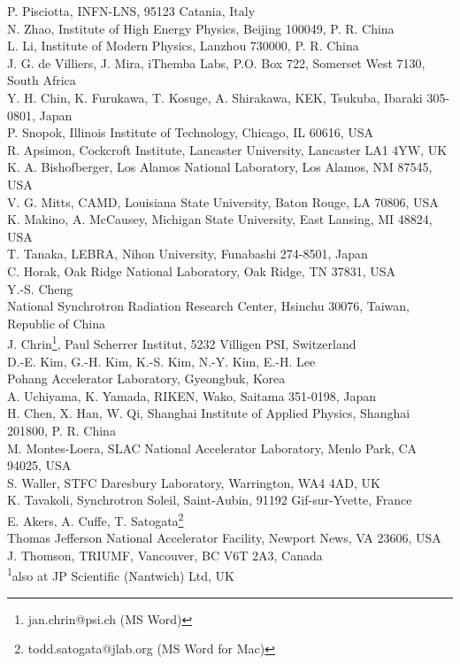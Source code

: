 \documentclass[a4paper,
               keeplastbox,   %
                luatex,       %
               ]{jacow}
\begin{document}
{		P. Pisciotta, INFN-LNS, 95123 Catania, Italy \\
		N. Zhao, Institute of High Energy Physics, Beijing 100049, P. R. China \\
		L. Li, Institute of Modern Physics, Lanzhou 730000, P. R. China \\
		J. G. de Villiers, J. Mira, iThemba Labs, P.O. Box 722, Somerset West 7130, South Africa \\
		Y. H. Chin, K. Furukawa, T. Kosuge, A. Shirakawa, 
		KEK, Tsukuba, Ibaraki 305-0801, Japan \\
		P. Snopok, Illinois Institute of Technology, Chicago, IL 60616, USA \\
		R. Apsimon, Cockcroft Institute, Lancaster University, Lancaster LA1 4YW, UK \\
		K. A. Bishofberger, Los Alamos National Laboratory, Los Alamos, NM 87545, USA \\
		V. G. Mitts, CAMD, Louisiana State University, Baton Rouge, LA 70806, USA \\ 
		K. Makino, A. McCausey, Michigan State University, East Lansing, MI 48824, USA \\
		T. Tanaka, LEBRA, Nihon University, Funabashi 274-8501, Japan \\
		C. Horak, Oak Ridge National Laboratory, Oak Ridge, TN 37831, USA \\
		Y.-S. Cheng \\
		National Synchrotron Radiation Research Center, Hsinchu 30076, Taiwan, Republic of China \\ 
		J. Chrin\thanks{jan.chrin@psi.ch (MS Word)}, Paul Scherrer Institut, 5232 Villigen PSI, Switzerland \\
		D.-E. Kim, G.-H. Kim, K.-S. Kim, N.-Y. Kim, E.-H. Lee \\
		Pohang Accelerator Laboratory, Gyeongbuk, Korea\\
		A. Uchiyama, K. Yamada, RIKEN, Wako, Saitama 351-0198, Japan \\
		H. Chen, X. Han, W. Qi, Shanghai Institute of Applied Physics, Shanghai 201800, P. R. China \\
		M. Montes-Loera, SLAC National Accelerator Laboratory, Menlo Park, CA 94025, USA \\
		S. Waller, STFC Daresbury Laboratory, Warrington, WA4 4AD, UK \\
		K. Tavakoli, Synchrotron Soleil, Saint-Aubin, 91192 Gif-sur-Yvette, France \\
		E. Akers, A. Cuffe, T. Satogata\thanks{todd.satogata@jlab.org (MS Word for Mac)} \\
		Thomas Jefferson National Accelerator Facility, Newport News, VA 23606, USA \\
		J. Thomson, TRIUMF, Vancouver, BC V6T 2A3, Canada \\
		\textsuperscript{1}also at JP Scientific (Nantwich) Ltd, UK}

	\maketitle

\end{document}
